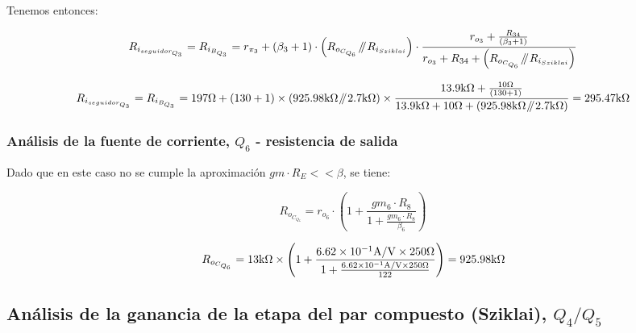Tenemos entonces:

\begin{equation}
R_{i_{seguidor_{Q_{3}}}} = R_{i_{B_{Q_{3}}}} = r_{\pi_{3}} + \left( \beta_{3} + 1 \right) \cdot  \left(  R_{o_{C_{Q_{6}}}} \parallelresistors R_{i_{Sziklai}}   \right)  \cdot \frac{  r_{o_{3}} + \frac{ R_{34} }{\left( \beta_{3} + 1 \right)} }{  r_{o_{3}} + R_{34} +  \left(  R_{o_{C_{Q_{6}}}} \parallelresistors R_{i_{Sziklai}}   \right)  }
\end{equation}


\begin{equation*}
R_{i_{seguidor_{Q_{3}}}} = R_{i_{B_{Q_{3}}}} = 197 \si[per-mode=symbol]{\ohm} + \left( 130 + 1 \right) \times \left(  925.98 \si[per-mode=symbol]{\kilo\ohm} \parallelresistors 2.7 \si[per-mode=symbol]{\kilo\ohm} \right)  \times \frac{  13.9 \si[per-mode=symbol]{\kilo\ohm} + \frac{ 10 \si[per-mode=symbol]{\ohm} }{\left( 130 + 1 \right)} }{  13.9 \si[per-mode=symbol]{\kilo\ohm} + 10 \si[per-mode=symbol]{\ohm} +  \left(  925.98 \si[per-mode=symbol]{\kilo\ohm} \parallelresistors 2.7 \si[per-mode=symbol]{\kilo\ohm} \right)  } = 295.47 \si[per-mode=symbol]{\kilo\ohm} 
\end{equation*}


\subsubsection{Análisis de la fuente de corriente, $Q_{6}$ - resistencia de salida}

Dado que en este caso no se cumple la aproximación $gm \cdot R_{E} << \beta$, se tiene:


\begin{equation}
R_{o_{C_{Q_{6}}}} = r_{o_{6}} \cdot \left( 1 + \frac{  gm_{6} \cdot R_{8}  }{  1 + \frac{ gm_{6} \cdot R_{8}  }{ \beta_{6} }   }     \right)
\end{equation}


\begin{equation*}
R_{o_{C_{Q_{6}}}} = 13 \si[per-mode=symbol]{\kilo\ohm} \times \left( 1 + \frac{  \num{6.62E-1} \si[per-mode=symbol]{\ampere\per\volt} \times 250 \si[per-mode=symbol]{\ohm}  }{  1 + \frac{  \num{6.62E-1} \si[per-mode=symbol]{\ampere\per\volt} \times 250 \si[per-mode=symbol]{\ohm}  }{ 122 }   }     \right) = 925.98 \si[per-mode=symbol]{\kilo\ohm}
\end{equation*}



\subsection{Análisis de la ganancia de la etapa del par compuesto (Sziklai), $Q_{4}/Q_{5}$}

